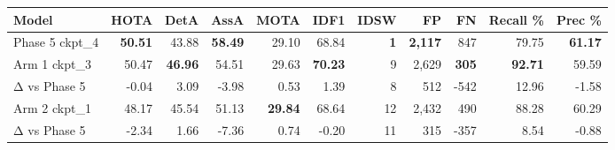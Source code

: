 \begin{tabular}{lrrrrrrrrrr}
\toprule
Model & HOTA & DetA & AssA & MOTA & IDF1 & IDSW & FP & FN & Recall \% & Prec \% \\
\midrule
Phase 5 ckpt\_4 & \textbf{50.51} & 43.88 & \textbf{58.49} & 29.10 & 68.84 & \textbf{1} & \textbf{2,117} & 847 & 79.75 & \textbf{61.17} \\
Arm 1 ckpt\_3 & 50.47 & \textbf{46.96} & 54.51 & 29.63 & \textbf{70.23} & 9 & 2,629 & \textbf{305} & \textbf{92.71} & 59.59 \\
  Δ vs Phase 5 & -0.04 & 3.09 & -3.98 & 0.53 & 1.39 & 8 & 512 & -542 & 12.96 & -1.58 \\
Arm 2 ckpt\_1 & 48.17 & 45.54 & 51.13 & \textbf{29.84} & 68.64 & 12 & 2,432 & 490 & 88.28 & 60.29 \\
  Δ vs Phase 5 & -2.34 & 1.66 & -7.36 & 0.74 & -0.20 & 11 & 315 & -357 & 8.54 & -0.88 \\
\bottomrule
\end{tabular}
